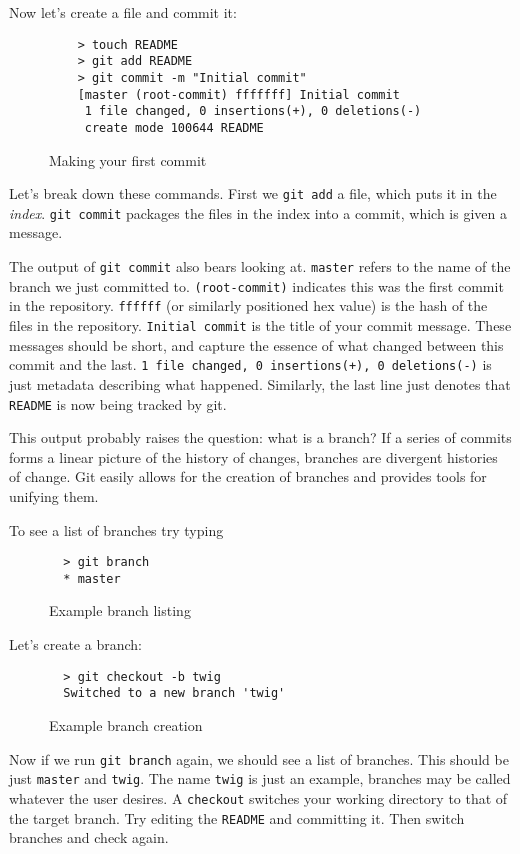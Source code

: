 \documentclass[11pt]{report}
\begin{document}
Now let's create a file and commit it:
\begin{figure}[H]
  \caption{Making your first commit}
  \begin{lstlisting}
    > touch README
    > git add README
    > git commit -m "Initial commit"
    [master (root-commit) fffffff] Initial commit
     1 file changed, 0 insertions(+), 0 deletions(-)
     create mode 100644 README
  \end{lstlisting}
\end{figure}

Let's break down these commands. First we \texttt{git add} a file,
which puts it in the \emph{index}. \texttt{git commit} packages the
files in the index into a commit, which is given a message.

The output of \texttt{git commit} also bears looking
at. \texttt{master} refers to the name of the branch we just committed
to. \texttt{(root-commit)} indicates this was the first commit in the
repository. \texttt{ffffff} (or similarly positioned hex value) is the
hash of the files in the repository. \texttt{Initial commit} is the
title of your commit message. These messages should be short, and
capture the essence of what changed between this commit and the
last. \texttt{1 file changed, 0 insertions(+), 0 deletions(-)} is just
metadata describing what happened. Similarly, the last line just
denotes that \texttt{README} is now being tracked by git.

This output probably raises the question: what is a branch?  If a
series of commits forms a linear picture of the history of changes,
branches are divergent histories of change. Git easily allows for the
creation of branches and provides tools for unifying them.

To see a list of branches try typing 
\begin{figure}[H]
  \caption{Example branch listing}
  \begin{lstlisting}
  > git branch
  * master
  \end{lstlisting}
 \end{figure}

Let's create a branch:
\begin{figure}[H]
  \caption{Example branch creation}
  \begin{lstlisting}
  > git checkout -b twig
  Switched to a new branch 'twig'
  \end{lstlisting}
\end{figure}

Now if we run \texttt{git branch} again, we should see a list of
branches. This should be just \texttt{master} and \texttt{twig}.
The name \texttt{twig} is just an example, branches may be called
whatever the user desires. A \texttt{checkout} switches your working
directory to that of the target branch. Try editing the \texttt{README}
and committing it. Then switch branches and check again.
\end{document}
